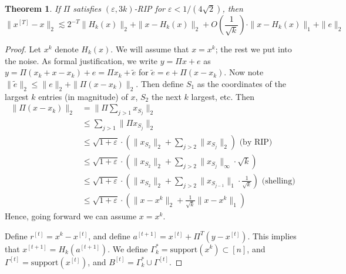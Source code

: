\documentclass[11pt]{article}
\newtheorem{theorem}{Theorem}
\newcommand{\ep}{\varepsilon}
\newcommand{\eps}{\varepsilon}
\begin{document}
\begin{theorem}
If $\Pi$ satisfies $(\ep, 3k)$-RIP for $\ep < 1/(4\sqrt{2})$, then
\[
\| x^{[T]} - x\|_2 \lesssim 2^{-T} \| H_k(x)\|_2 + \|x - H_k(x)\|_2 + O\left(\frac{1}{\sqrt{k}} \right) \cdot\|x - H_k(x)\|_1 + \|e\|_2
\]
\end{theorem}
\begin{proof}
Let $x^k$ denote $H_k(x)$. We will assume that $x = x^k$; the rest we put into the noise.  As formal justification, we write $y = \Pi x + e$ as $y = \Pi (x_k + x - x_k) + e = \Pi x_k + \tilde{e}$ for $\tilde{e} = e + \Pi(x - x_k)$. Now note $\|\tilde{e}\|_2 \le \|e\|_2 + \|\Pi (x - x_k)\|_2$. Then define $S_1$ as the coordinates of the largest $k$ entries (in magnitude) of $x$, $S_2$ the next $k$ largest, etc. Then
\begin{align*}
\|\Pi (x - x_k)\|_2 &= \|\Pi \sum_{j>1} x_{S_j}\|_2\\
{}&\le \sum_{j>1} \|\Pi x_{S_j}\|_2\\
{}&\le \sqrt{1+\eps}\cdot \left(\|x_{S_2}\|_2 + \sum_{j>2} \|x_{S_j}\|_2\right)\text{ (by RIP)}\\
{}&\le \sqrt{1+\eps}\cdot \left(\|x_{S_2}\|_2 + \sum_{j>2} \|x_{S_j}\|_\infty\cdot \sqrt{k}\right)\\
{}&\le \sqrt{1+\eps}\cdot \left(\|x_{S_2}\|_2 + \sum_{j>2} \|x_{S_{j-1}}\|_1\cdot \frac{1}{\sqrt{k}}\right) \text{ (shelling)}\\
{}&\le \sqrt{1+\eps}\cdot \left(\|x - x^k\|_2 + \frac 1{\sqrt{k}}\|x - x^k\|_1\right)
\end{align*}
Hence, going forward we can assume $x = x^k$. 

Define $r^{[t]} = x^k - x^{[t]}$, and define $a^{[t+1]} = x^{[t]} + \Pi^T(y - x^{[t]})$. This implies that $x^{[t+1]} = H_k(a^{[t+1]})$. We define $\Gamma_k^* = \text{support}(x^k) \subset [n]$, and $\Gamma^{[t]} = \text{support}(x^{[t]})$, and $B^{[t]} = \Gamma_k^* \cup \Gamma^{[t]}$.


\end{proof}
\end{document}
